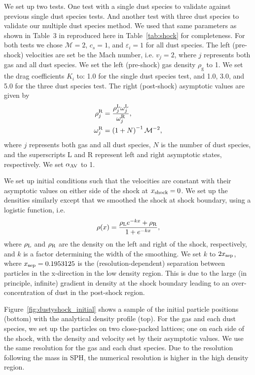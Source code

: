\documentclass[fleqn,usenatbib]{mnras}
\newcommand{\g}{\mathrm{g}}
\begin{document}
We set up two tests. One test with a single dust species to validate against
previous single dust species tests. And another test with three dust species to
validate our multiple dust species method. We used that same parameters as shown
in Table~3 in \citet{Benitez-Llambay2019ApJS..241...25B} reproduced here in
Table~\ref{tab:shock} for completeness. For both tests we chose \(\mathcal{M} =
2\), \(c_s = 1\), and \(\varepsilon_i = 1\) for all dust species. The left
(pre-shock) velocities are set be the Mach number, i.e. \(v_j= 2\), where \(j\)
represents both gas and all dust species. We set the left (pre-shock) gas
density \(\rho_{\g}\) to 1. We set the drag coefficients \(K_i\) to: 1.0 for the
single dust species test, and 1.0, 3.0, and 5.0 for the three dust species test.
The right (post-shock) asymptotic values are given by
%
\begin{align}
   \rho_{j}^{\rm R} &=
      \frac{\rho_{j}^{\rm L} \omega_{j}^{\rm L}} {\omega_{j}^{\rm R}}, \\
   \omega_j^{\rm R} &= \left(1 + N \right)^{-1} \mathcal{M}^{-2},
\end{align}
%
where \(j\) represents both gas and all dust species, \(N\) is the number of
dust species, and the superscripts L and R represent left and right asymptotic
states, respectively. We set \(\alpha_{\rm AV}\) to 1.

We set up initial conditions such that the velocities are constant with their
asymptotic values on either side of the shock at \(x_{\rm shock} = 0\). We set
up the densities similarly except that we smoothed the shock at shock boundary,
using a logistic function, i.e.
%
\begin{align}
   \rho(x) = \frac{\rho_{\rm L} e^{-kx} + \rho_{\rm R}}{1 + e^{-kx}},
\end{align}
%
where \(\rho_{\rm L}\) and \(\rho_{\rm R}\) are the density on the left and
right of the shock, respectively, and \(k\) is a factor determining the width of
the smoothing. We set \(k\) to \(2 x_{\rm sep}\), where \(x_{\rm sep} =
0.1953125\) is the (resolution-dependent) separation between particles in the
x-direction in the low density region. This is due to the large (in principle,
infinite) gradient in density at the shock boundary leading to an
over-concentration of dust in the post-shock region.

Figure~\ref{fig:dustyshock_initial} shows a sample of the initial particle
positions (bottom) with the analytical density profile (top). For the gas and
each dust species, we set up the particles on two close-packed lattices; one on
each side of the shock, with the density and velocity set by their asymptotic
values. We use the same resolution for the gas and each dust species. Due to the
resolution following the mass in SPH, the numerical resolution is higher in the
high density region.
\end{document}
